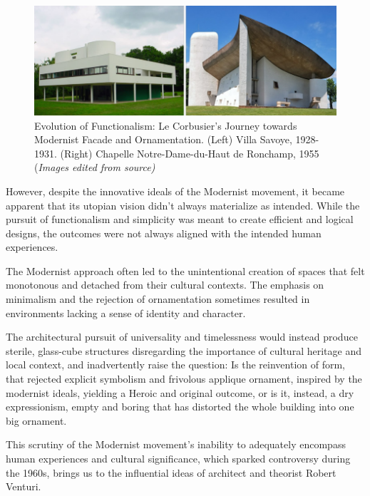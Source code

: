      \begin{figure}[htb]
          \centering
          \includegraphics[width= \linewidth]{Images/ModernistFacade}
          \caption{Evolution of Functionalism: Le Corbusier's Journey towards Modernist Facade and Ornamentation. (Left) Villa Savoye, 1928-1931. (Right) Chapelle Notre-Dame-du-Haut de Ronchamp, 1955 (\textit{Images edited from source)}}
          \label{fig:Modernistfacade}
        \end{figure}


However, despite the innovative ideals of the Modernist movement,  it became apparent that its utopian vision didn't always materialize as intended.
While the pursuit of functionalism and simplicity was meant to create efficient and logical designs, the outcomes were not always aligned with the intended human experiences.

The Modernist approach often led to the unintentional creation of spaces that felt monotonous and detached from their cultural contexts.
The emphasis on minimalism and the rejection of ornamentation sometimes resulted in environments lacking a sense of identity and character.

The architectural pursuit of universality and timelessness would instead produce sterile, glass-cube structures\cite{Schudel2018} disregarding the importance of cultural heritage and local context, and inadvertently raise the question: Is the reinvention of form, that rejected explicit symbolism and frivolous applique ornament, inspired by the modernist ideals,  yielding a Heroic and original outcome, or is it, instead, a dry expressionism, empty and boring that has distorted the whole building into one big ornament\cite{Venturi1971}.

This scrutiny of the Modernist movement's inability to adequately encompass human experiences and cultural significance, which sparked controversy during the 1960s, brings us to the influential ideas of architect and theorist Robert Venturi.

